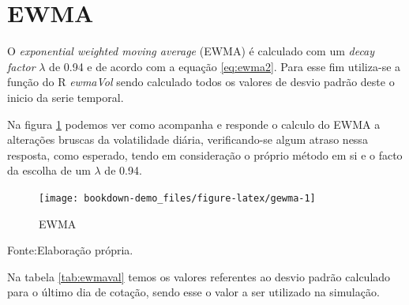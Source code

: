 \documentclass[
  12pt,
  a4paper,
  openany]{book}
\newenvironment{Shaded}{\begin{snugshade}}{\end{snugshade}}
\newcommand{\CommentTok}[1]{\textcolor[rgb]{0.56,0.35,0.01}{\textit{#1}}}
\newcommand{\ControlFlowTok}[1]{\textcolor[rgb]{0.13,0.29,0.53}{\textbf{#1}}}
\newcommand{\DataTypeTok}[1]{\textcolor[rgb]{0.13,0.29,0.53}{#1}}
\newcommand{\DecValTok}[1]{\textcolor[rgb]{0.00,0.00,0.81}{#1}}
\newcommand{\FloatTok}[1]{\textcolor[rgb]{0.00,0.00,0.81}{#1}}
\newcommand{\KeywordTok}[1]{\textcolor[rgb]{0.13,0.29,0.53}{\textbf{#1}}}
\newcommand{\NormalTok}[1]{#1}
\newcommand{\OperatorTok}[1]{\textcolor[rgb]{0.81,0.36,0.00}{\textbf{#1}}}
\newcommand{\StringTok}[1]{\textcolor[rgb]{0.31,0.60,0.02}{#1}}
\begin{document}
\hypertarget{ewma}{%
\section{EWMA}\label{ewma}}

O \emph{exponential weighted moving average} (EWMA) é calculado com um \emph{decay factor} \(\lambda\) de 0.94 e de acordo com a equação \eqref{eq:ewma2}. Para esse fim utiliza-se a função do R \emph{ewmaVol} sendo calculado todos os valores de desvio padrão deste o inicio da serie temporal.

\scriptsize

\begin{Shaded}
\end{Shaded}

\normalsize

Na figura \ref{fig:gewma} podemos ver como acompanha e responde o calculo do EWMA a alterações bruscas da volatilidade diária, verificando-se algum atraso nessa resposta, como esperado, tendo em consideração o próprio método em si e o facto da escolha de um \(\lambda\) de 0.94.

\begin{figure}

{\centering \texttt{[image: bookdown-demo\_files/figure-latex/gewma-1]} 

}

\caption{EWMA}\label{fig:gewma}
\end{figure}
\FloatBarrier
\centering

Fonte:Elaboração própria.

\justifying
\bigskip

Na tabela \ref{tab:ewmaval} temos os valores referentes ao desvio padrão calculado para o último dia de cotação, sendo esse o valor a ser utilizado na simulação.
\end{document}
